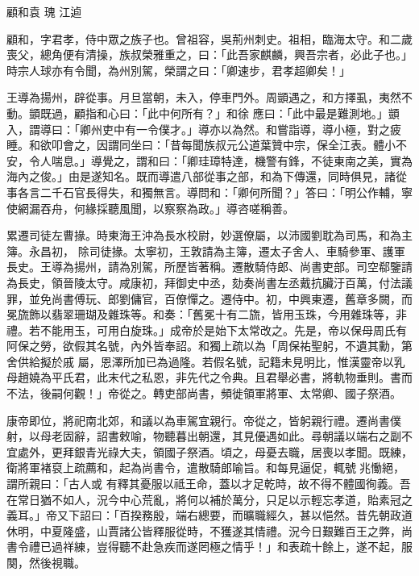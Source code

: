 
\begin{pinyinscope}
顧和袁
 瑰
 江逌



 顧和，字君孝，侍中眾之族子也。曾祖容，吳荊州刺史。祖相，臨海太守。和二歲喪父，總角便有清操，族叔榮雅重之，曰：「此吾家麒麟，興吾宗者，必此子也。」時宗人球亦有令聞，為州別駕，榮謂之曰：「卿速步，君孝超卿矣！」



 王導為揚州，辟從事。月旦當朝，未入，停車門外。周顗遇之，和方擇虱，夷然不動。顗既過，顧指和心曰：「此中何所有？」和徐
 應曰：「此中最是難測地。」顗入，謂導曰：「卿州吏中有一令僕才。」導亦以為然。和嘗詣導，導小極，對之疲睡。和欲叩會之，因謂同坐曰：「昔每聞族叔元公道葉贊中宗，保全江表。體小不安，令人喘息。」導覺之，謂和曰：「卿珪璋特達，機警有鋒，不徒東南之美，實為海內之俊。」由是遂知名。既而導遣八部從事之部，和為下傳還，同時俱見，諸從事各言二千石官長得失，和獨無言。導問和：「卿何所聞？」答曰：「明公作輔，寧使網漏吞舟，何緣採聽風聞，以察察為政。」導咨嗟稱善。



 累遷司徒左曹掾。時東海王沖為長水校尉，妙選僚屬，以沛國劉耽為司馬，和為主簿。永昌初，
 除司徒掾。太寧初，王敦請為主簿，遷太子舍人、車騎參軍、護軍長史。王導為揚州，請為別駕，所歷皆著稱。遷散騎侍郎、尚書吏部。司空郗鑒請為長史，領晉陵太守。咸康初，拜御史中丞，劾奏尚書左丞戴抗臟汙百萬，付法議罪，並免尚書傅玩、郎劉傭官，百僚憚之。遷侍中。初，中興東遷，舊章多闕，而冕旒飾以翡翠珊瑚及雜珠等。和奏：「舊冕十有二旒，皆用玉珠，今用雜珠等，非禮。若不能用玉，可用白旋珠。」成帝於是始下太常改之。先是，帝以保母周氏有阿保之勞，欲假其名號，內外皆奉詔。和獨上疏以為「周保祐聖躬，不遺其勳，第舍供給擬於戚
 屬，恩澤所加已為過隆。若假名號，記籍未見明比，惟漢靈帝以乳母趙嬈為平氏君，此末代之私恩，非先代之令典。且君舉必書，將軌物垂則。書而不法，後嗣何觀！」帝從之。轉吏部尚書，頻徙領軍將軍、太常卿、國子祭酒。



 康帝即位，將祀南北郊，和議以為車駕宜親行。帝從之，皆躬親行禮。遷尚書僕射，以母老固辭，詔書敕喻，物聽暮出朝還，其見優遇如此。尋朝議以端右之副不宜處外，更拜銀青光祿大夫，領國子祭酒。頃之，母憂去職，居喪以孝聞。既練，衛將軍褚裒上疏薦和，起為尚書令，遣散騎郎喻旨。和每見逼促，輒號兆慟絕，謂所親曰：「古人或
 有釋其憂服以祗王命，蓋以才足乾時，故不得不體國徇義。吾在常日猶不如人，況今中心荒亂，將何以補於萬分，只足以示輕忘孝道，貽素冠之義耳。」帝又下詔曰：「百揆務殷，端右總要，而曠職經久，甚以悒然。昔先朝政道休明，中夏隆盛，山賈諸公皆釋服從時，不獲遂其情禮。況今日艱難百王之弊，尚書令禮已過祥練，豈得聽不赴急疾而遂罔極之情乎！」和表疏十餘上，遂不起，服闋，然後視職。




\end{pinyinscope}
